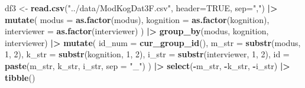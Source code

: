 \documentclass[
  doc,floatsintext]{apa6}
\newenvironment{Shaded}{\begin{snugshade}}{\end{snugshade}}
\newcommand{\AttributeTok}[1]{\textcolor[rgb]{0.13,0.29,0.53}{#1}}
\newcommand{\ConstantTok}[1]{\textcolor[rgb]{0.56,0.35,0.01}{#1}}
\newcommand{\DecValTok}[1]{\textcolor[rgb]{0.00,0.00,0.81}{#1}}
\newcommand{\FunctionTok}[1]{\textcolor[rgb]{0.13,0.29,0.53}{\textbf{#1}}}
\newcommand{\NormalTok}[1]{#1}
\newcommand{\OtherTok}[1]{\textcolor[rgb]{0.56,0.35,0.01}{#1}}
\newcommand{\SpecialCharTok}[1]{\textcolor[rgb]{0.81,0.36,0.00}{\textbf{#1}}}
\newcommand{\StringTok}[1]{\textcolor[rgb]{0.31,0.60,0.02}{#1}}
\begin{document}
\begin{Shaded}
\begin{Highlighting}[]
\NormalTok{df3 }\OtherTok{\textless{}{-}} \FunctionTok{read.csv}\NormalTok{(}\StringTok{"../data/ModKogDat3F.csv"}\NormalTok{, }\AttributeTok{header=}\ConstantTok{TRUE}\NormalTok{, }\AttributeTok{sep=}\StringTok{","}\NormalTok{) }\SpecialCharTok{|\textgreater{}} 
  \FunctionTok{mutate}\NormalTok{(}
    \AttributeTok{modus =} \FunctionTok{as.factor}\NormalTok{(modus),}
    \AttributeTok{kognition =} \FunctionTok{as.factor}\NormalTok{(kognition),}
    \AttributeTok{interviewer =} \FunctionTok{as.factor}\NormalTok{(interviewer)}
\NormalTok{  ) }\SpecialCharTok{|\textgreater{}} 
    \FunctionTok{group\_by}\NormalTok{(modus, kognition, interviewer) }\SpecialCharTok{|\textgreater{}} 
  \FunctionTok{mutate}\NormalTok{(}
    \AttributeTok{id\_num =} \FunctionTok{cur\_group\_id}\NormalTok{(),}
    \AttributeTok{m\_str =} \FunctionTok{substr}\NormalTok{(modus, }\DecValTok{1}\NormalTok{, }\DecValTok{2}\NormalTok{),}
    \AttributeTok{k\_str =} \FunctionTok{substr}\NormalTok{(kognition, }\DecValTok{1}\NormalTok{, }\DecValTok{2}\NormalTok{),}
    \AttributeTok{i\_str =} \FunctionTok{substr}\NormalTok{(interviewer, }\DecValTok{1}\NormalTok{, }\DecValTok{2}\NormalTok{),}
    \AttributeTok{id =} \FunctionTok{paste}\NormalTok{(m\_str, k\_str, i\_str, }\AttributeTok{sep =} \StringTok{"\_"}\NormalTok{)}
\NormalTok{  ) }\SpecialCharTok{|\textgreater{}} 
  \FunctionTok{select}\NormalTok{(}\SpecialCharTok{{-}}\NormalTok{m\_str, }\SpecialCharTok{{-}}\NormalTok{k\_str, }\SpecialCharTok{{-}}\NormalTok{i\_str) }\SpecialCharTok{|\textgreater{}} 
  \FunctionTok{tibble}\NormalTok{() }
\end{Highlighting}
\end{Shaded}
\end{document}

